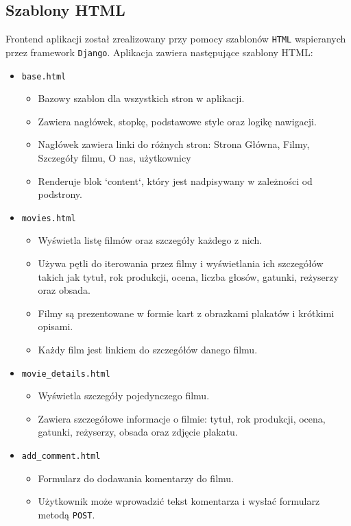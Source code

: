 \documentclass[../main.tex]{subfiles}
\begin{document}
\subsection{Szablony HTML}
Frontend aplikacji został zrealizowany przy pomocy szablonów \texttt{HTML} wspieranych przez framework \texttt{Django}. Aplikacja zawiera następujące szablony HTML:

\begin{itemize}
	\item \texttt{base.html}
	      \begin{itemize}
		      \item Bazowy szablon dla wszystkich stron w aplikacji.
		      \item Zawiera nagłówek, stopkę, podstawowe style oraz logikę nawigacji.
		      \item Nagłówek zawiera linki do różnych stron: Strona Główna, Filmy, Szczegóły filmu, O nas,  użytkownicy
		      \item Renderuje blok `content`, który jest nadpisywany w zależności od podstrony.
	      \end{itemize}
	\item \texttt{movies.html}
	      \begin{itemize}
		      \item Wyświetla listę filmów oraz szczegóły każdego z nich.
		      \item Używa pętli do iterowania przez filmy i wyświetlania ich szczegółów takich jak tytuł, rok produkcji,  ocena, liczba głosów, gatunki, reżyserzy oraz obsada.
		      \item Filmy są prezentowane w formie kart z obrazkami plakatów i krótkimi opisami.
		      \item Każdy film jest linkiem do szczegółów danego filmu.
	      \end{itemize}
	\item \texttt{movie\_details.html}
	      \begin{itemize}
		      \item Wyświetla szczegóły pojedynczego filmu.
		      \item Zawiera szczegółowe informacje o filmie: tytuł, rok produkcji, ocena, gatunki, reżyserzy, obsada oraz zdjęcie plakatu.
	      \end{itemize}
	\item \texttt{add\_comment.html}
	      \begin{itemize}
		      \item Formularz do dodawania komentarzy do filmu.
		      \item Użytkownik może wprowadzić tekst komentarza i wysłać formularz metodą \texttt{POST}.

\end{itemize}
\end{itemize}
\end{document}
